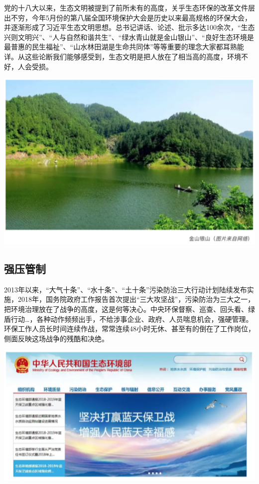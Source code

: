 \documentclass[
]{book}
\begin{document}
党的十八大以来，生态文明被提到了前所未有的高度，关乎生态环保的改革文件层出不穷，今年5月份的第八届全国环境保护大会是历史以来最高规格的环保大会，并逐渐形成了习近平生态文明思想。总书记讲话、论述、批示多达100余次，``生态兴则文明兴''、``人与自然和谐共生''、``绿水青山就是金山银山''、``良好生态环境是最普惠的民生福祉''、``山水林田湖是生命共同体''等等重要的理念大家都耳熟能详。从这些论断我们能够感受到，生态文明是把人放在了相当高的高度，环境不好，人会受损。

\includegraphics[width=6.67in]{images/fw2}

\hypertarget{ux5f3aux538bux7ba1ux5236}{%
\subsection{强压管制}\label{ux5f3aux538bux7ba1ux5236}}

2013年以来，``大气十条''、``水十条''、``土十条''污染防治三大行动计划陆续发布实施，2018年，国务院政府工作报告首次提出``三大攻坚战''，污染防治为三大之一，把环境治理放在了战争的高度，这是何等决心。中央环保督察、巡查、回头看、绿盾行动\ldots，各种动作频频出手，不给涉事企业、政府、人员喘息机会，强硬管理。环保工作人员长时间连续作战，常常连续48小时无休、甚至有的倒在了工作岗位，侧面反映这场战争的残酷和决绝。

\includegraphics[width=6.67in]{images/fw3}
\end{document}
